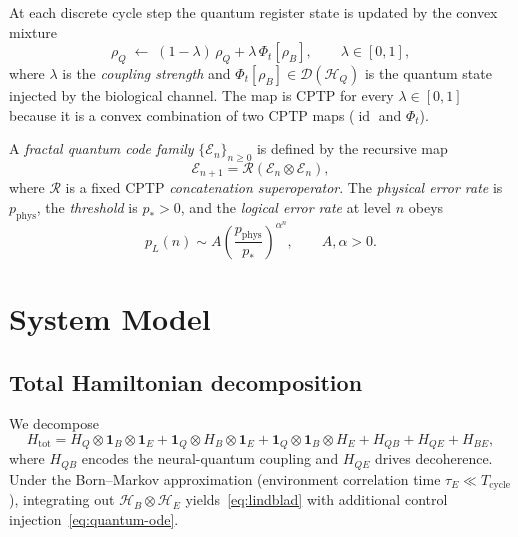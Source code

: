 \begin{definition}\label{def:bio-update}
At each discrete cycle step the quantum register state is updated by
the convex mixture
\begin{equation}\label{eq:bio-update}
  \rho_Q \;\leftarrow\; (1-\lambda)\,\rho_Q + \lambda\,\Phi_t[\rho_B],
  \qquad \lambda \in [0,1],
\end{equation}
where $\lambda$ is the \emph{coupling strength} and
$\Phi_t[\rho_B] \in \mathcal{D}(\mathcal{H}_Q)$ is the quantum state
injected by the biological channel.  The map is CPTP for every
$\lambda \in [0,1]$ because it is a convex combination of two CPTP
maps ($\operatorname{id}$ and $\Phi_t$).
\end{definition}

\begin{definition}\label{def:fractal-code}
A \emph{fractal quantum code family} $\{\mathcal{E}_n\}_{n \geq 0}$ is
defined by the recursive map
\begin{equation}\label{eq:fractal-recursion}
  \mathcal{E}_{n+1} = \mathcal{R}(\mathcal{E}_n \otimes \mathcal{E}_n),
\end{equation}
where $\mathcal{R}$ is a fixed CPTP \emph{concatenation
superoperator}.  The \emph{physical error rate} is $p_{\mathrm{phys}}$,
the \emph{threshold} is $p_* > 0$, and the \emph{logical error rate} at
level $n$ obeys
\begin{equation}\label{eq:pL-scaling}
  p_L(n) \sim A \!\left(\frac{p_{\mathrm{phys}}}{p_*}\right)^{\!\alpha^n},
  \qquad A, \alpha > 0.
\end{equation}
\end{definition}

\section{System Model}
\label{sec:ch21-model}

\subsection{Total Hamiltonian decomposition}

We decompose
\begin{equation}\label{eq:H-total}
  H_{\mathrm{tot}}
  = H_Q \otimes \mathbf{1}_B \otimes \mathbf{1}_E
  + \mathbf{1}_Q \otimes H_B \otimes \mathbf{1}_E
  + \mathbf{1}_Q \otimes \mathbf{1}_B \otimes H_E
  + H_{QB} + H_{QE} + H_{BE},
\end{equation}
where $H_{QB}$ encodes the neural-quantum coupling and $H_{QE}$ drives
decoherence.  Under the Born--Markov approximation (environment
correlation time $\tau_E \ll T_{\mathrm{cycle}}$), integrating out
$\mathcal{H}_B \otimes \mathcal{H}_E$ yields~\eqref{eq:lindblad} with
additional control injection~\eqref{eq:quantum-ode}.

